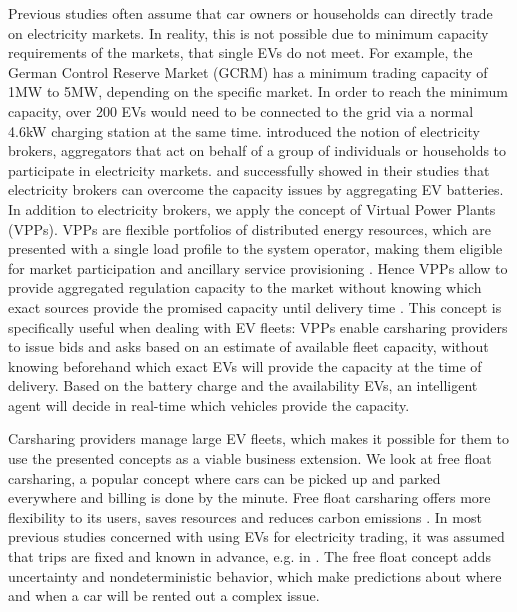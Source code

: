 \documentclass[12pt, article]{article}
\begin{document}
Previous studies often assume that car owners or households can directly trade
on electricity markets. In reality, this is not possible due to minimum capacity
requirements of the markets, that single EVs do not meet. For example, the German
Control Reserve Market (GCRM) has a minimum trading capacity of 1MW to 5MW,
depending on the specific market. In order to reach the minimum capacity, over
200 EVs would need to be connected to the grid via a normal 4.6kW charging
station at the same time. \textcite{ketter13_power_tac} introduced the notion of
electricity brokers, aggregators that act on behalf of a group of individuals or
households to participate in electricity markets.
\textcite{brandt17_evaluat_busin_model_vehic_grid_integ} and
\textcite{kahlen14_balan_with_elect_vehic} successfully showed in their studies
that electricity brokers can overcome the capacity issues by aggregating EV
batteries. In addition to electricity brokers, we apply the concept of Virtual
Power Plants (VPPs). VPPs are flexible portfolios of distributed energy
resources, which are presented with a single load profile to the system
operator, making them eligible for market participation and ancillary service
provisioning \parencite{pudjianto07_virtual_power_plant_system_integ}. Hence VPPs
allow to provide aggregated regulation capacity to the market without knowing
which exact sources provide the promised capacity until delivery time
\parencite{kahlen17_fleet}. This concept is specifically useful when dealing with
EV fleets: VPPs enable carsharing providers to issue bids and asks based on an
estimate of available fleet capacity, without knowing beforehand which exact EVs
will provide the capacity at the time of delivery. Based on the battery charge
and the availability EVs, an intelligent agent will decide in real-time which
vehicles provide the capacity.

Carsharing providers manage large EV fleets, which makes it possible for them to
use the presented concepts as a viable business extension. We look at free float
carsharing, a popular concept where cars can be picked up and parked everywhere
and billing is done by the minute. Free float carsharing offers more flexibility
to its users, saves resources and reduces carbon emissions
\parencite{firnkorn15_free_float_elect_carsh_fleet_smart_cities}. In most previous
studies concerned with using EVs for electricity trading, it was assumed that
trips are fixed and known in advance, e.g. in
\textcite{tomic07_using_fleet_elect_drive_vehic_grid_suppor}. The free float
concept adds uncertainty and nondeterministic behavior, which make predictions
about where and when a car will be rented out a complex issue.
\end{document}
